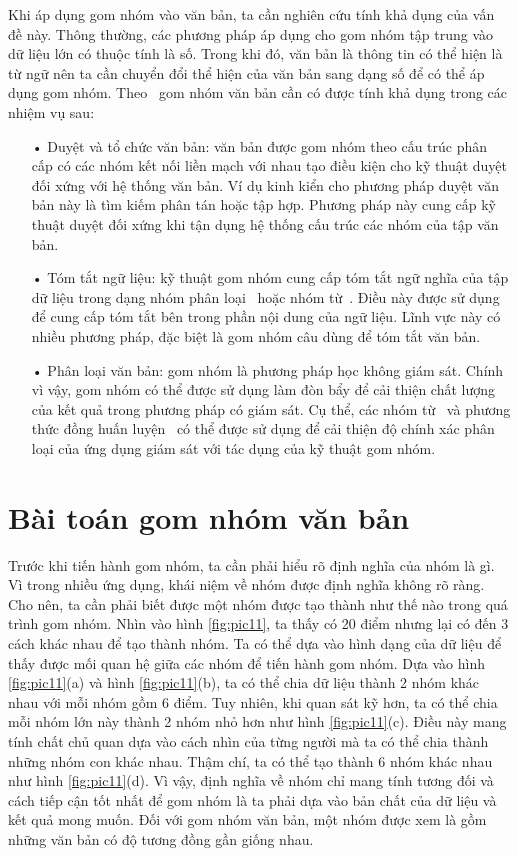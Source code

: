 Khi áp dụng gom nhóm vào văn bản, ta cần nghiên cứu tính khả dụng của vấn đề này.
Thông thường, các phương pháp áp dụng cho gom nhóm tập trung vào dữ liệu lớn có thuộc tính là số.
Trong khi đó, văn bản là thông tin có thể hiện là từ ngữ nên ta cần chuyển đổi thể hiện của văn bản sang dạng số để có thể áp dụng gom nhóm.
Theo~\cite{text-cluster} gom nhóm văn bản cần có được tính khả dụng trong các nhiệm vụ sau:
\begin{enumerate}
\item[•]Duyệt và tổ chức văn bản: văn bản được gom nhóm theo cấu trúc phân cấp có các nhóm kết nối liền mạch với nhau tạo điều kiện cho kỹ thuật duyệt đối xứng với hệ thống văn bản.
Ví dụ kinh kiển cho phương pháp duyệt văn bản này là tìm kiếm phân tán hoặc tập hợp.
Phương pháp này cung cấp kỹ thuật duyệt đối xứng khi tận dụng hệ thống cấu trúc các nhóm của tập văn bản.
\item[•]Tóm tắt ngữ liệu: kỹ thuật gom nhóm cung cấp tóm tắt ngữ nghĩa của tập dữ liệu trong dạng nhóm phân loại~\cite{cluster-digest} hoặc nhóm từ~\cite{cluster-word-1, cluster-word-2}.
Điều này được sử dụng để cung cấp tóm tắt bên trong phần nội dung của ngữ liệu.
Lĩnh vực này có nhiều phương pháp, đặc biệt là gom nhóm câu dùng để tóm tắt văn bản.
\item[•]Phân loại văn bản: gom nhóm là phương pháp học không giám sát.
Chính vì vậy, gom nhóm có thể được sử dụng làm đòn bẩy để cải thiện chất lượng của kết quả trong phương pháp có giám sát.
Cụ thể, các nhóm từ~\cite{cluster-word-1, cluster-word-2} và phương thức đồng huấn luyện~\cite{cluster-word-3} có thể được sử dụng để cải thiện độ chính xác phân loại của ứng dụng giám sát với tác dụng của kỹ thuật gom nhóm.
\end{enumerate}

\section{Bài toán gom nhóm văn bản}
Trước khi tiến hành gom nhóm, ta cần phải hiểu rõ định nghĩa của nhóm là gì.
Vì trong nhiều ứng dụng, khái niệm về nhóm được định nghĩa không rõ ràng.
Cho nên, ta cần phải biết được một nhóm được tạo thành như thế nào trong quá trình gom nhóm.
Nhìn vào hình \ref{fig:pic11}, ta thấy có 20 điểm nhưng lại có đến 3 cách khác nhau để tạo thành nhóm.
Ta có thể dựa vào hình dạng của dữ liệu để thấy được mối quan hệ giữa các nhóm để tiến hành gom nhóm.
Dựa vào hình \ref{fig:pic11}(a) và hình \ref{fig:pic11}(b), ta có thể chia dữ liệu thành 2 nhóm khác nhau với mỗi nhóm gồm 6 điểm.
Tuy nhiên, khi quan sát kỹ hơn, ta có thể chia mỗi nhóm lớn này thành 2 nhóm nhỏ hơn như hình \ref{fig:pic11}(c).
Điều này mang tính chất chủ quan dựa vào cách nhìn của từng người mà ta có thể chia thành những nhóm con khác nhau.
Thậm chí, ta có thể tạo thành 6 nhóm khác nhau như hình \ref{fig:pic11}(d).
Vì vậy, định nghĩa về nhóm chỉ mang tính tương đối và cách tiếp cận tốt nhất để gom nhóm là ta phải dựa vào bản chất của dữ liệu và kết quả mong muốn.
Đối với gom nhóm văn bản, một nhóm được xem là gồm những văn bản có độ tương đồng gần giống nhau.

